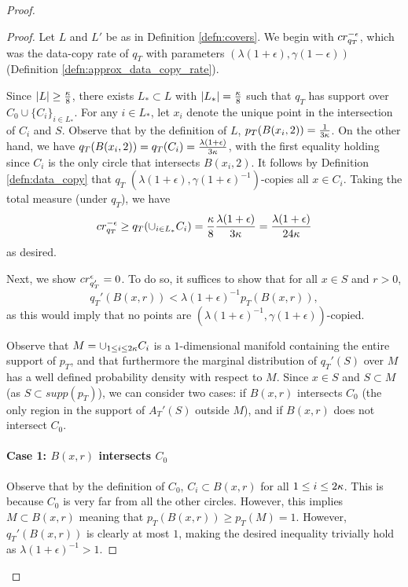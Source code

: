\begin{proof}
\begin{proof}
Let $L$ and $L'$ be as in Definition \ref{defn:covers}. We begin with $cr_{q_T}^{-\epsilon}$, which was the data-copy rate of $q_T$ with parameters $(\lambda(1+\epsilon), \gamma(1-\epsilon))$ (Definition \ref{defn:approx_data_copy_rate}).

Since $|L| \geq \frac{\kappa}{8}$, there exists $L_* \subset L$ with $|L_*| = \frac{\kappa}{8}$ such that $q_T$ has support over $C_0 \cup \{C_i\}_{i \in L_*}$. For any $i \in L_*$, let $x_i$ denote the unique point in the intersection of $C_i$ and $S$. Observe that by the definition of $L$, $p_T(B(x_i, 2)) = \frac{1}{3\kappa}$. On the other hand, we have $q_T(B(x_i, 2)) = q_T(C_i) = \frac{\lambda(1+\epsilon)}{3\kappa}$, with the first equality holding since $C_i$ is the only circle that intersects $B(x_i, 2)$. It follows by Definition \ref{defn:data_copy} that $q_T$ $(\lambda(1+\epsilon), \gamma(1+\epsilon)^{-1})$-copies all $x \in C_i$. Taking the total measure (under $q_T$), we have $$cr_{q_T}^{-\epsilon} \geq q_T (\cup_{i \in L_*} C_i) = \frac{\kappa}{8}\frac{\lambda(1+\epsilon)}{3\kappa} = \frac{\lambda(1+\epsilon)}{24\kappa}$$ as desired. 

Next, we show $cr_{q_T'}^{\epsilon} = 0$. To do so, it suffices to show that for all $x \in S$ and $r > 0$, $$q_T'(B(x, r)) < \lambda(1+\epsilon)^{-1} p_T(B(x, r)),$$  as this would imply that no points are $(\lambda(1+\epsilon)^{-1}, \gamma(1+\epsilon))$-copied. 

Observe that  $M = \cup_{1 \leq i \leq 2\kappa} C_i$ is a $1$-dimensional manifold containing the entire support of $p_T$, and that furthermore the marginal distribution of $q_T'(S)$ over $M$ has a well defined probability density with respect to $M$. Since $x \in S$ and $S \subset M$ (as $S \subset supp(p_T)$), we can consider two cases: if $B(x, r)$ intersects $C_0$ (the only region in the support of $A_T'(S)$ outside $M$), and if $B(x,r)$ does not intersect $C_0$.

\paragraph{Case 1: $B(x, r)$ intersects $C_0$} Observe that by the definition of $C_0$, $C_i \subset B(x, r)$ for all $1 \leq i \leq 2\kappa$. This is because $C_0$ is very far from all the other circles. However, this implies $M \subset B(x, r)$ meaning that $p_T(B(x, r)) \geq p_T(M) = 1$. However, $q_T'(B(x, r))$ is clearly at most $1$, making the desired inequality trivially hold as $\lambda(1+\epsilon)^{-1} > 1$.


\end{proof}
\end{proof}
